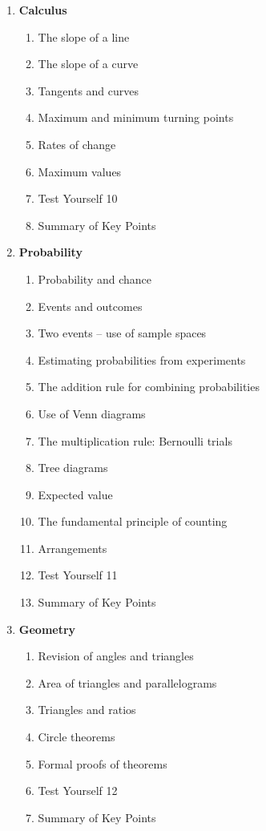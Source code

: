 \documentclass{article}
\begin{document}
\begin{enumerate}
    \item \textbf{Calculus}
    \begin{enumerate}
        \item The slope of a line
        \item The slope of a curve
        \item Tangents and curves
        \item Maximum and minimum turning points
        \item Rates of change
        \item Maximum values
        \item Test Yourself 10
        \item Summary of Key Points
    \end{enumerate}

    \item \textbf{Probability}
    \begin{enumerate}
        \item Probability and chance
        \item Events and outcomes
        \item Two events – use of sample spaces
        \item Estimating probabilities from experiments
        \item The addition rule for combining probabilities
        \item Use of Venn diagrams
        \item The multiplication rule: Bernoulli trials
        \item Tree diagrams
        \item Expected value
        \item The fundamental principle of counting
        \item Arrangements
        \item Test Yourself 11
        \item Summary of Key Points
    \end{enumerate}

    \item \textbf{Geometry}
    \begin{enumerate}
        \item Revision of angles and triangles
        \item Area of triangles and parallelograms
        \item Triangles and ratios
        \item Circle theorems
        \item Formal proofs of theorems
        \item Test Yourself 12
        \item Summary of Key Points
    \end{enumerate}


\end{enumerate}
\end{document}
